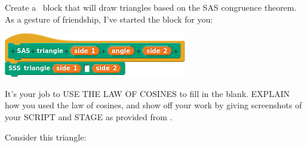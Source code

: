 \documentclass[noauthor,nooutcomes,handout]{ximera}
\begin{document}
\begin{question}
  Create a \snap\ block that will draw triangles based on the SAS
  congruence theorem.  As a gesture of friendship, I've started the
  block for you:
  \begin{center}
    \includegraphics{sasBlockBLANK}
  \end{center}
  It's your job to USE THE LAW OF COSINES to fill in the
  blank. EXPLAIN how you used the law of cosines, and show off your
  work by giving screenshots of your SCRIPT and STAGE as provided
  from \snap.
  \begin{freeResponse}
    Consider this triangle:
    \begin{center}
\end{center}
\end{freeResponse}
\end{question}
\end{document}
